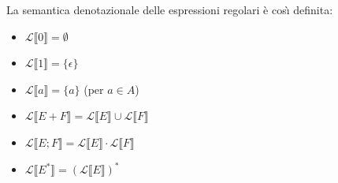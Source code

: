 		\qquad La semantica denotazionale delle espressioni regolari \`{e} cos\`{\i} definita:
		\begin{itemize}
		  \item $\mathcal{L} \llbracket 0 \rrbracket = \emptyset$
		  \item $\mathcal{L} \llbracket 1 \rrbracket = \{\epsilon\}$
		  \item $\mathcal{L} \llbracket a \rrbracket = \{a\}$ (per $a \in A$)
		  \item $\mathcal{L} \llbracket E + F \rrbracket = \mathcal{L} \llbracket E
		  	\rrbracket \cup \mathcal{L} \llbracket F
		  	\rrbracket$
		  \item $\mathcal{L} \llbracket E ; F \rrbracket = \mathcal{L} \llbracket E
		  	\rrbracket \cdot \mathcal{L} \llbracket F
		  	\rrbracket$ 
		  \item $\mathcal{L} \llbracket E^* \rrbracket = (\mathcal{L} \llbracket E
		  	\rrbracket)^*$ 
		\end{itemize}
		
